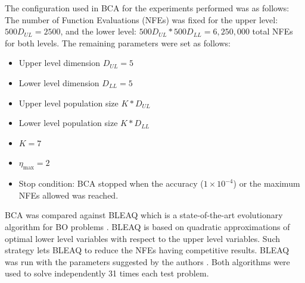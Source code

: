 \documentclass[conference]{IEEEtran}
\begin{document}
The configuration used in BCA for the experiments performed was as follows:
% 
% 
The number of Function Evaluations (NFEs) was fixed for the upper level: $500D_{UL} = 2500$, 
and the lower level: $500D_{UL}*500D_{LL} = 6,250,000$ total NFEs for both levels.
The remaining parameters were set as follows:
\begin{itemize}
    \item Upper level dimension $D_{UL} = 5$
    \item Lower level dimension $D_{LL} = 5$
    \item Upper level population size $K*D_{UL}$
    \item Lower level population size $K*D_{LL}$
    \item $K = 7$
    \item $\eta_{\max} = 2$
    \item Stop condition: BCA stopped when the accuracy ($1\times 10^{-4}$) or
    the maximum NFEs allowed was reached.
\end{itemize}


BCA was compared against BLEAQ which is a state-of-the-art evolutionary algorithm
for BO problems \cite{sinha2018review,sinha2013efficient}. BLEAQ is based on quadratic
approximations of optimal lower level variables with respect to the upper level
variables. Such strategy lets BLEAQ to reduce the NFEs having competitive results.
BLEAQ was run with the parameters suggested by the authors \cite{sinha2018review,sinha2013efficient}.
Both algorithms were used to solve independently 31 times each test problem.
\end{document}
